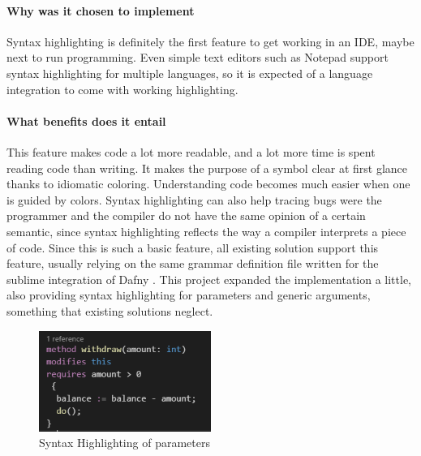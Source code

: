 \paragraph{Why was it chosen to implement}
Syntax highlighting is definitely the first feature to get working in an IDE, maybe next to run programming. Even simple text editors such as Notepad support syntax highlighting for multiple languages, so it is expected of a language integration to come with working highlighting. \newline

\paragraph{What benefits does it entail}
This feature makes code a lot more readable, and a lot more time is spent reading code than writing. It makes the purpose of a symbol clear at first glance thanks to idiomatic coloring. Understanding code becomes much easier when one is guided by colors. Syntax highlighting can also help tracing bugs were the programmer and the compiler do not have the same opinion of a certain semantic, since syntax highlighting reflects the way a compiler interprets a piece of code. \newline
Since this is such a basic feature, all existing solution support this feature, usually relying on the same grammar definition file written for the sublime integration of Dafny \cite{sublime}. This project expanded the implementation a little, also providing syntax highlighting for parameters and generic arguments, something that existing solutions neglect.
\begin{figure}[H]
	\centering
	\includegraphics[width=0.5\textwidth]{img/syntaxHighlightingMethod}
	\caption{Syntax Highlighting of parameters}
	\label{fig:agsyntaxHighlightingMethod}
\end{figure}